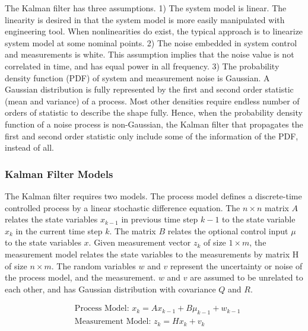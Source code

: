 
The Kalman filter has three assumptions. 1) The system model is
linear. The linearity is desired in that the system model is more
easily manipulated with engineering tool. When nonlinearities do
exist, the typical approach is to linearize system model at some
nominal points. 2) The noise embedded in system control and
measurements is white. This assumption implies that the noise value is
not correlated in time, and has equal power in all frequency. 3) The
probability density function (PDF) of system and measurement noise is
Gaussian. A Gaussian distribution is fully represented by the first
and second order statistic (mean and variance) of a process. Most
other densities require endless number of orders of statistic to
describe the shape fully. Hence, when the probability density function
of a noise process is non-Gaussian, the Kalman filter that propagates
the first and second order statistic only include some of the
information of the PDF, instead of all.

\subsubsection{Kalman Filter Models}

The Kalman filter requires two models. The process model defines a
discrete-time controlled process by a linear stochastic difference
equation. The $n\times n$ matrix $A$ relates the state variables
$x_{k-1}$ in previous time step $k-1$ to the state variable $x_{k}$ in
the current time step $k$. The matrix $B$ relates the optional control
input $\mu$ to the state variables $x$. Given measurement vector $z_k$
of size $1 \times m$, the measurement model relates the state
variables to the measurements by matrix H of size $n \times m$. The
random variables $w$ and $v$ represent the uncertainty or noise of the
process model, and the measurement. $w$ and $v$ are assumed to be
unrelated to each other, and has Gaussian distribution with covariance
$Q$ and $R$.

\begin{align}
&\text{Process Model: }x_k = Ax_{k-1}+B\mu_{k-1}+w_{k-1}\\
&\text{Measurement Model: }z_k = Hx_k+v_k
\end{align}

